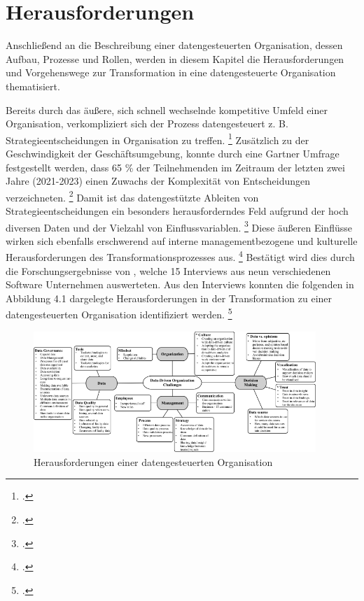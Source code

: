 \chapter[Herausforderungen]{Herausforderungen}

Anschließend an die Beschreibung einer datengesteuerten Organisation, dessen Aufbau, Prozesse und Rollen, werden in diesem Kapitel die Herausforderungen und Vorgehenswege zur Transformation in eine datengesteuerte Organisation thematisiert.

Bereits durch das äußere, sich schnell wechselnde kompetitive Umfeld einer Organisation, verkompliziert sich der Prozess datengesteuert z. B. Strategieentscheidungen in Organisation zu treffen. \footcite[Vgl.][S. 2]{Pratt.2023} 
Zusätzlich zu der Geschwindigkeit der Geschäftsumgebung, konnte durch eine Gartner Umfrage festgestellt werden, dass 65 \% der Teilnehmenden im Zeitraum der letzten zwei Jahre (2021-2023) einen Zuwachs der Komplexität von Entscheidungen verzeichneten. \footcite[Vgl.][S. 65]{Pratt.2023}
Damit ist das datengestützte Ableiten von Strategieentscheidungen ein besonders herausforderndes Feld aufgrund der hoch diversen Daten und der Vielzahl von Einflussvariablen. \footcite[Vgl.][S. 3]{Pratt.2023}
Diese äußeren Einflüsse wirken sich ebenfalls erschwerend auf interne managementbezogene und kulturelle Herausforderungen des Transformationsprozesses aus. \footcite[Vgl.][S. 15]{Dalpiaz.2020}
Bestätigt wird dies durch die Forschungsergebnisse von , welche 15 Interviews aus neun verschiedenen Software Unternehmen auswerteten.
Aus den Interviews konnten die folgenden in Abbildung 4.1 dargelegte Herausforderungen in der Transformation zu einer datengesteuerten Organisation identifiziert werden. \footcite[][S. 9]{Dalpiaz.2020}

\begin{figure}[htb]
    \centering
    \includegraphics[width=0.95\textwidth]{graphics/DDO challenges.png}
    \caption{Herausforderungen einer datengesteuerten Organisation}
    \label{fig:DDOs challenges}
\end{figure}

